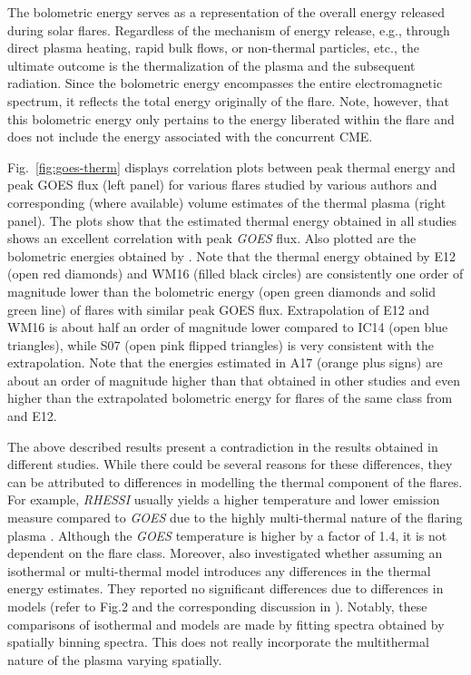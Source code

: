 The bolometric energy serves as a representation of the overall energy released during solar flares. Regardless of the mechanism of energy release, e.g., through direct plasma heating, rapid bulk flows, or non-thermal particles, etc., the ultimate outcome is the thermalization of the plasma and the subsequent radiation. Since the bolometric energy encompasses the entire electromagnetic spectrum, it reflects the total energy originally of the flare. Note, however, that this bolometric energy only pertains to the energy liberated within the flare and does not include the energy associated with the concurrent CME. %

Fig.~\ref{fig:goes-therm} displays correlation plots between peak thermal energy and peak GOES flux (left panel) for various flares studied by various authors and corresponding (where available) volume estimates of the thermal plasma (right panel). The plots show that the estimated thermal energy obtained in all studies shows an excellent correlation with peak {\it GOES} flux. Also plotted are the bolometric energies obtained by \cite{emslie12, kretzschmar11}. %
Note that the thermal energy obtained by E12 (open red diamonds) and WM16 (filled black circles) are consistently one order of magnitude lower than the bolometric energy (open green diamonds and solid green line) of flares with similar peak GOES flux. Extrapolation of E12 and WM16 is about half an order of magnitude lower compared to IC14 (open blue triangles), while S07 (open pink flipped triangles) is very consistent with the extrapolation. Note that the energies estimated in A17 (orange plus signs) are about an order of magnitude higher than that obtained in other studies and even higher than the extrapolated bolometric energy for flares of the same class from \cite{kretzschmar11} and E12. 

The above described results present a contradiction in the results obtained in different studies. While there could be several reasons for these differences, they can be attributed to differences in modelling the thermal component of the flares. For example, {\it RHESSI} usually yields a higher temperature and lower emission measure compared to {\it GOES} due to the highly multi-thermal nature of the flaring plasma \citep{bataglia05,ryan14,warmuth16a}. Although the {\it GOES} temperature is higher by a factor of 1.4, it is not dependent on the flare class. Moreover, \cite{warmuth20} also investigated whether assuming an isothermal or multi-thermal model introduces any differences in the thermal energy estimates. They reported no significant differences due to differences in models (refer to Fig.2 and the corresponding discussion in \cite{warmuth20}). Notably, these comparisons of isothermal and models are made by fitting spectra obtained by spatially binning spectra. This does not really incorporate the multithermal nature of the plasma varying spatially.

